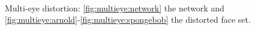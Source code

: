 \begin{figure}
{    }
     \\
    \caption{Multi-eye distortion: \ref{fig:multieye:network} the network and \ref{fig:multieye:arnold}-\ref{fig:multieye:spongebob} the distorted face set.\label{fig:multieye}}
\end{figure}

